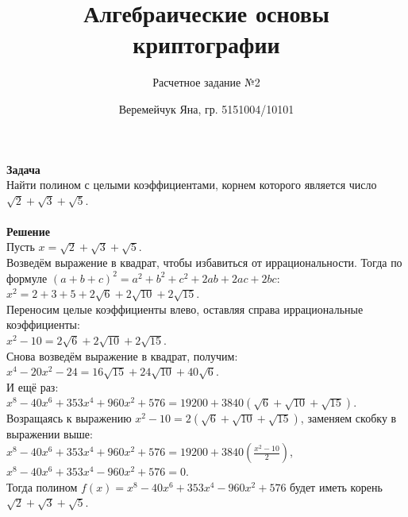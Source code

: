 \documentclass{article}
\title{Алгебраические основы криптографии}
\author{Расчетное задание №2}
\date{Веремейчук Яна, гр. 5151004/10101}
\begin{document}
\maketitle

\textbf{Задача}\\

Найти полином с целыми коэффициентами, корнем которого является число $\sqrt{2}+ \sqrt{3} +\sqrt{5}$.\\
\\

\textbf{Решение}\\

Пусть $x = \sqrt{2}+ \sqrt{3} +\sqrt{5}$.\\

Возведём выражение в квадрат, чтобы избавиться от иррациональности. Тогда по формуле $(a + b + c)^2 = a^2 + b^2 + c^2 + 2ab + 2ac + 2bc$:\\
$x^2 = 2 + 3 + 5 + 2\sqrt{6}+ 2\sqrt{10} + 2\sqrt{15}$.\\

Переносим целые коэффициенты влево, оставляя справа иррациональные коэффициенты:\\
$x^2 - 10 = 2\sqrt{6}+ 2\sqrt{10} + 2\sqrt{15}$.\\

Снова возведём выражение в квадрат, получим:\\
$x^4 - 20x^2 - 24 = 16\sqrt{15}+ 24\sqrt{10} + 40\sqrt{6}$.\\

И ещё раз:\\
$x^8 - 40x^6 +353x^4 + 960x^2 + 576 = 19200 + 3840(\sqrt{6}+ \sqrt{10} + \sqrt{15})$.\\

Возращаясь к выражению $x^2 - 10 = 2(\sqrt{6}+ \sqrt{10} + \sqrt{15})$, заменяем скобку в выражении выше:\\
$x^8 - 40x^6 + 353x^4 + 960x^2 + 576 = 19200 + 3840(\frac{x^2 - 10}{2})$,\\
$x^8 - 40x^6 + 353x^4 - 960x^2 + 576 = 0$.\\

Тогда полином $f(x) = x^8 - 40x^6 + 353x^4 - 960x^2 + 576$ будет иметь корень $\sqrt{2}+ \sqrt{3} +\sqrt{5}$.
\end{document}
